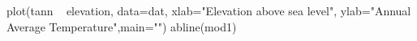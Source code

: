 \begin{Schunk}
\begin{Sinput}
 plot(tann ~ elevation, data=dat, xlab="Elevation above sea level", ylab="Annual Average Temperature",main="")
 abline(mod1)
\end{Sinput}
\end{Schunk}
